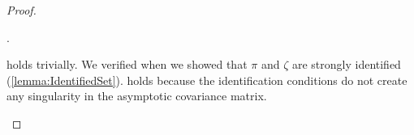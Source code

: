 \documentclass[11pt, letterpaper, twoside, final]{article}
\begin{document}
\begin{appendices}
\begin{proof}
\begin{proofpart}
\end{proofpart}

\begin{proofpart}
    \label{mainTheoremProofPart4}.
   
     holds trivially.
    We verified  when we showed that $\pi$ and $\zeta$ are strongly identified
    (\cref{lemma:IdentifiedSet}).
     holds because the identification conditions do not create any singularity in the
    asymptotic covariance matrix. 

\end{proofpart}

\end{proof}


\end{appendices}
\end{document}
